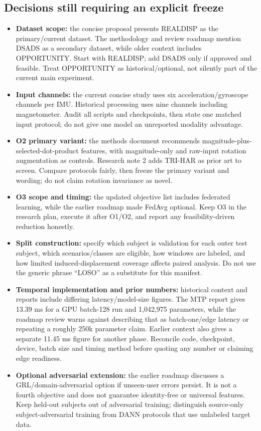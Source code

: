 \documentclass[10pt,a4paper]{article}
\begin{document}
\subsection{Decisions still requiring an explicit freeze}
\begin{itemize}
\item \textbf{Dataset scope:} the concise proposal presents REALDISP as the primary/current dataset. The methodology and review roadmap mention DSADS as a secondary dataset, while older context includes OPPORTUNITY. Start with REALDISP; add DSADS only if approved and feasible. Treat OPPORTUNITY as historical/optional, not silently part of the current main experiment.
\item \textbf{Input channels:} the current concise study uses six acceleration/gyroscope channels per IMU. Historical processing uses nine channels including magnetometer. Audit all scripts and checkpoints, then state one matched input protocol; do not give one model an unreported modality advantage.
\item \textbf{O2 primary variant:} the methods document recommends magnitude-plus-selected-dot-product features, with magnitude-only and raw-input rotation augmentation as controls. Research note 2 adds TRI-HAR as prior art to screen. Compare protocols fairly, then freeze the primary variant and wording; do not claim rotation invariance as novel.
\item \textbf{O3 scope and timing:} the updated objective list includes federated learning, while the earlier roadmap made FedAvg optional. Keep O3 in the research plan, execute it after O1/O2, and report any feasibility-driven reduction honestly.
\item \textbf{Split construction:} specify which subject is validation for each outer test subject, which scenarios/classes are eligible, how windows are labeled, and how limited induced-displacement coverage affects paired analysis. Do not use the generic phrase ``LOSO'' as a substitute for this manifest.
\item \textbf{Temporal implementation and prior numbers:} historical context and reports include differing latency/model-size figures. The MTP report gives 13.39 ms for a GPU batch-128 run and 1,042,975 parameters, while the roadmap review warns against describing that as batch-one/edge latency or repeating a roughly 250k parameter claim. Earlier context also gives a separate 11.45 ms figure for another phase. Reconcile code, checkpoint, device, batch size and timing method before quoting any number or claiming edge readiness.
\item \textbf{Optional adversarial extension:} the earlier roadmap discusses a GRL/domain-adversarial option if unseen-user errors persist. It is not a fourth objective and does not guarantee identity-free or universal features. Keep held-out subjects out of adversarial training; distinguish source-only subject-adversarial training from DANN protocols that use unlabeled target data.
\end{itemize}
\end{document}
